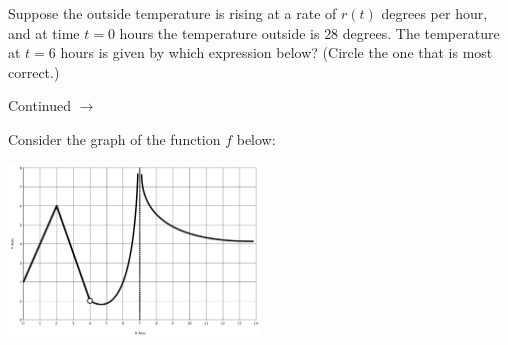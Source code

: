\documentclass[addpoints]{exam}
\def\pageturn{\vfill
\begin{flushright}
	\begin{small}
		Continued $\rightarrow$
	\end{small}
\end{flushright}
\newpage}
\begin{document}
\begin{questions}
\question[2] Suppose the outside temperature is rising at a rate of $r(t)$ degrees per hour, and at time $t = 0$ hours the temperature outside is $28$ degrees. The temperature at $t = 6$ hours is given by which expression below? (Circle the one that is most correct.)
			
\pageturn


\question Consider the graph of the function $f$ below: 
\begin{center}
	\includegraphics[width=0.5\textwidth]{fe-graphlimits}
\end{center}
\end{questions}
\end{document}
